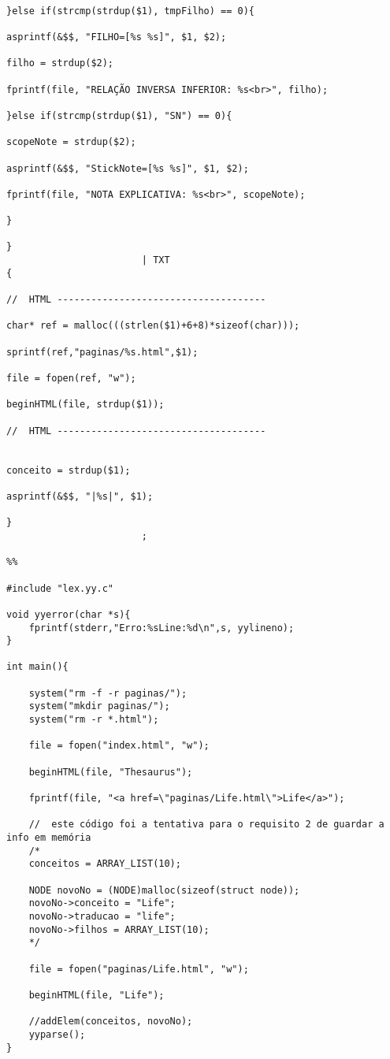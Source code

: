 \documentclass[11pt,a4paper]{report}%
\begin{document}
\begin{verbatim}
																				}else if(strcmp(strdup($1), tmpFilho) == 0){
																					asprintf(&$$, "FILHO=[%s %s]", $1, $2);
																					filho = strdup($2);
																					fprintf(file, "RELAÇÃO INVERSA INFERIOR: %s<br>", filho);
																				}else if(strcmp(strdup($1), "SN") == 0){
																					scopeNote = strdup($2);
																					asprintf(&$$, "StickNote=[%s %s]", $1, $2);
																					fprintf(file, "NOTA EXPLICATIVA: %s<br>", scopeNote);
																				}
																			}
						| TXT                                               {
																				//	HTML -------------------------------------
																				char* ref = malloc(((strlen($1)+6+8)*sizeof(char)));
                                                								sprintf(ref,"paginas/%s.html",$1);
																				file = fopen(ref, "w");
																				beginHTML(file, strdup($1));
																				//	HTML -------------------------------------

																				conceito = strdup($1);
																				asprintf(&$$, "|%s|", $1);
																			}
						;

%%

#include "lex.yy.c"

void yyerror(char *s){
	fprintf(stderr,"Erro:%sLine:%d\n",s, yylineno);
}

int main(){

	system("rm -f -r paginas/");
    system("mkdir paginas/");
    system("rm -r *.html");

	file = fopen("index.html", "w");

	beginHTML(file, "Thesaurus");

	fprintf(file, "<a href=\"paginas/Life.html\">Life</a>");

	//	este código foi a tentativa para o requisito 2 de guardar a info em memória
	/*
	conceitos = ARRAY_LIST(10);
	
	NODE novoNo = (NODE)malloc(sizeof(struct node));
	novoNo->conceito = "Life";
	novoNo->traducao = "life";
	novoNo->filhos = ARRAY_LIST(10);
	*/

	file = fopen("paginas/Life.html", "w");

	beginHTML(file, "Life");
	
	//addElem(conceitos, novoNo);
	yyparse();
}
\end{verbatim}
\end{document}
